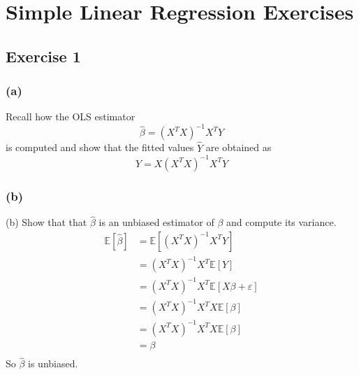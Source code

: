 \documentclass{article}
\newcommand{\E}{\mathbb{E}}
\begin{document}
\section{Simple Linear Regression Exercises}

\subsection{Exercise 1}
\subsubsection{(a)}
Recall how the OLS estimator
$$
    \hat{\beta}=\left(X^{T} X\right)^{-1} X^{T} Y
$$
is computed and show that the fitted values $\hat{Y}$ are obtained as
$$
    \hat{Y}=X\left(X^{T} X\right)^{-1} X^{T} Y
$$

\subsubsection{(b)}
(b) Show that that $\hat{\beta}$ is an unbiased estimator of $\beta$ and compute its variance.
\begin{align*}
    \E [\hat \beta]
     & = \E \left[ \left(X^{T} X\right)^{-1} X^{T} Y \right]                     \\
     & = \left(X^{T} X\right)^{-1} X^{T} \E \left[ Y \right]                     \\
     & = \left(X^{T} X\right)^{-1} X^{T} \E \left[ X \beta + \varepsilon \right] \\
     & = \left(X^{T} X\right)^{-1} X^{T} X \E \left[ \beta \right]               \\
     & = \left(X^{T} X\right)^{-1} X^{T} X \E \left[ \beta \right]               \\
     & =  \beta                                                                  \\
\end{align*}
So \(\hat \beta\) is unbiased.
\end{document}
